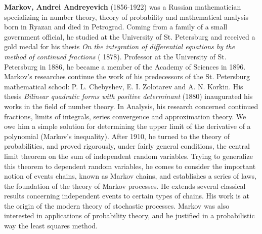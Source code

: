 \textbf{Markov, Andrei Andreyevich} (1856-1922) was a Russian mathematician specializing in number theory, theory of probability and mathematical analysis born in Ryazan and died in Petrograd. Coming from a family of a small government official, he studied at the University of St. Petersburg and received a gold medal for his thesis\textit{ On the integration of differential equations by the method of continued fractions} ( 1878). Professor at the University of St. Petersburg in 1886, he became a member of the Academy of Sciences in 1896. Markov's researches continue the work of his predecessors of the St. Petersburg mathematical school: P. L. Chebyshev, E. I. Zolotarev and A. N. Korkin. His thesis \textit{Bilinear quadratic forms with positive determinant} (1880) inaugurated his works in the field of number theory. In Analysis, his research concerned continued fractions, limits of integrals, series convergence and approximation theory. We owe him a simple solution for determining the upper limit of the derivative of a polynomial (Markov's inequality). After 1910, he turned to the theory of probabilities, and proved rigorously, under fairly general conditions, the central limit theorem on the sum of independent random variables. Trying to generalize this theorem to dependent random variables, he comes to consider the important notion of events chains, known as Markov chains, and establishes a series of laws, the foundation of the theory of Markov processes. He extends several classical results concerning independent events to certain types of chains. His work is at the origin of the modern theory of stochastic processes. Markov was also interested in applications of probability theory, and he justified in a probabilistic way the least squares method.

